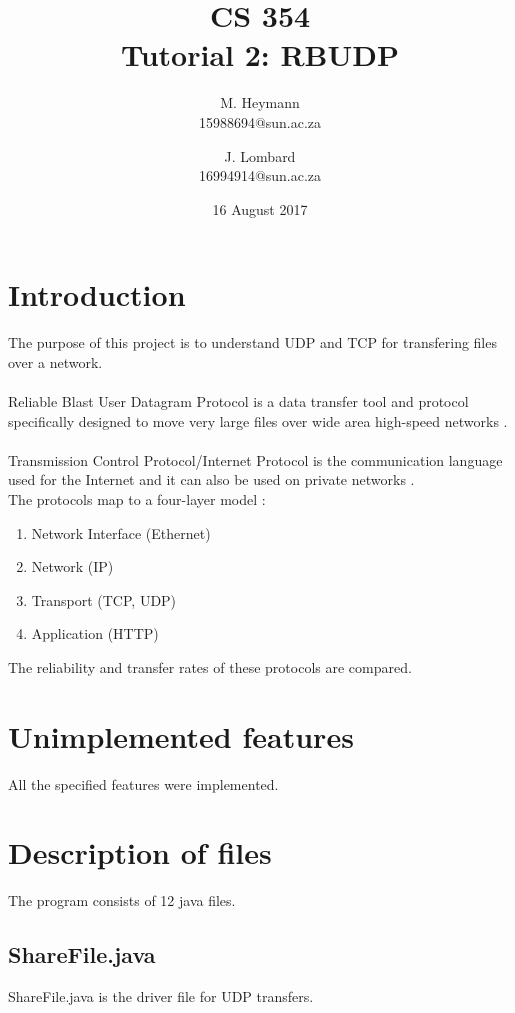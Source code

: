 \documentclass[a4paper,10pt]{article}
\title{CS 354\\Tutorial 2: RBUDP}
\author{M. Heymann\\15988694@sun.ac.za \and J. Lombard\\16994914@sun.ac.za}
\date{16 August 2017}
\begin{document}
\clearpage\maketitle
\thispagestyle{empty} %

\pagebreak

\clearpage\tableofcontents
\thispagestyle{empty}

\pagebreak
\setcounter{page}{1} %

\section{Introduction}
The purpose of this project is to understand UDP and TCP for transfering files
over a network.\\\\
Reliable Blast User Datagram Protocol is a data transfer tool and protocol
specifically designed to move very large files over wide area high-speed
networks \cite{udpDef}.\\\\
Transmission Control Protocol/Internet Protocol is the communication language
used for the Internet and it can also be used on private networks
\cite{tcpDef}.\\
The protocols map to a four-layer model \cite{map}:
\begin{enumerate}
	\item Network Interface (Ethernet)
	\item Network (IP)
	\item Transport (TCP, UDP)
	\item Application (HTTP)
\end{enumerate}
The reliability and transfer rates of these protocols are compared.

\section{Unimplemented features}
All the specified features were implemented.

\section{Description of files}
The program consists of 12 java files.

\subsection{ShareFile.java}
ShareFile.java is the driver file for UDP transfers.
\end{document}
